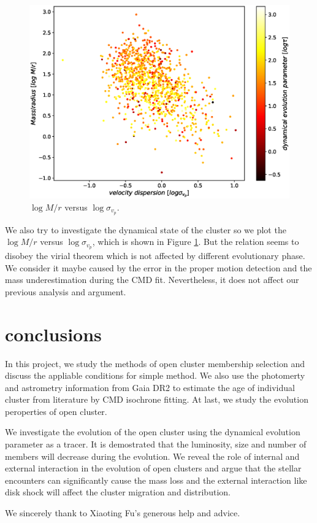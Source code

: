\documentclass[modern]{aastex63}
\begin{document}
\begin{figure}[t]
\centering
\includegraphics[width=1\linewidth]{5.eps}

\caption{$\log M/r$ versus $\log \sigma_{v_p}$.}
\label{3}
\end{figure}
We also try to investigate the dynamical state of the cluster so we plot the $\log M/r$ versus $\log \sigma_{v_p}$, which is shown in Figure \ref{3}. But the relation seems to disobey the virial theorem which is not affected by different evolutionary phase. We consider it maybe caused by the error in the proper motion detection and the mass underestimation during the CMD fit. Nevertheless, it does not affect our previous analysis and argument.

\bigskip
\bigskip
\section{conclusions}\label{con}
In this project, we study the methods of open cluster membership selection and discuss the appliable conditions for simple method. We also use the photomerty and astrometry information from Gaia DR2 to estimate the age of individual cluster from literature by CMD isochrone fitting. At last, we study the evolution peroperties of open cluster.

We investigate the evolution of the open cluster using the dynamical evolution parameter as a tracer. It is demostrated that the luminosity, size and number of members will decrease during the evolution. We reveal the role of internal and external interaction in the evolution of open clusters and argue that the stellar encounters can significantly cause the mass loss and the external interaction like disk shock will affect the cluster migration and distribution.


\acknowledgments
We sincerely thank to Xiaoting Fu's generous help and advice.

\newpage
{}

\end{document}
